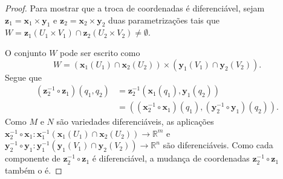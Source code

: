 \begin{definition}
\begin{proof}
			Para mostrar que a troca de coordenadas é diferenciável, sejam $\mathbf{z}_1 = \mathbf{x}_1 \times \mathbf{y}_1$ e $\mathbf{z}_2 = \mathbf{x}_2 \times \mathbf{y}_2$ duas parametrizações tais que $W = \mathbf{z}_1(U_1 \times V_1) \cap \mathbf{z}_2(U_2 \times V_2) \neq \emptyset$.

			O conjunto $W$ pode ser escrito como
			\begin{equation*}
				W = \left(\mathbf{x}_1(U_1) \cap \mathbf{x}_2(U_2)\right) \times \left(\mathbf{y}_1(V_1) \cap \mathbf{y}_2(V_2)\right).
			\end{equation*}
			Segue que
			\begin{align*}
				(\mathbf{z}_2^{-1} \circ \mathbf{z}_1)(q_1, q_2) & = \mathbf{z}_2^{-1}(\mathbf{x}_1(q_1), \mathbf{y}_1(q_2))                                                   \\
				                                                 & = \left( (\mathbf{x}_2^{-1} \circ \mathbf{x}_1)(q_1), (\mathbf{y}_2^{-1} \circ \mathbf{y}_1)(q_2) \right) .
			\end{align*}
			Como $M$ e $N$ são variedades diferenciáveis, as aplicações $\mathbf{x}_2^{-1} \circ \mathbf{x}_1 : \mathbf{x}_1^{-1}(\mathbf{x}_1(U_1) \cap \mathbf{x}_2(U_2)) \to \mathbb{R}^m$ e $\mathbf{y}_2^{-1} \circ \mathbf{y}_1 : \mathbf{y}_1^{-1}(\mathbf{y}_1(V_1) \cap \mathbf{y}_2(V_2)) \to \mathbb{R}^n$ são diferenciáveis.
			Como cada componente de $\mathbf{z}_2^{-1} \circ \mathbf{z}_1$ é diferenciável, a mudança de coordenadas $\mathbf{z}_2^{-1} \circ \mathbf{z}_1$ também o é.
		\end{proof}
	\end{definition}
